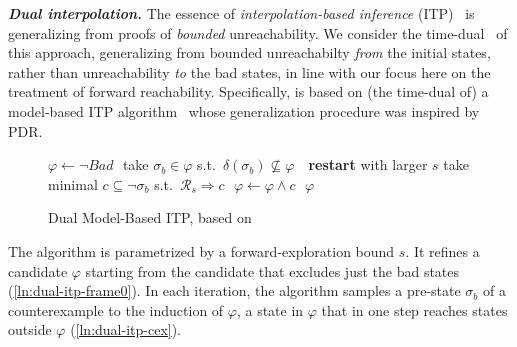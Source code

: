 \documentclass[acmsmall,screen]{acmart}
\newcommand{\para}[1]{\vspace{2pt}\noindent\textbf{\textit{#1.}}}
\renewcommand{\implies}{\Longrightarrow}
\newcommand{\Init}{{\textit{Init}}}
\newcommand{\Bad}{\textit{Bad}}
\newcommand{\tr}{\delta}
\begin{document}
\para{Dual interpolation}
\label{sec:dual-itp-compare}
%
%
%
%
%
%
%
%
%
%
%
%
%
%
%
%
%
%
%
%
%
%
%
%
%
%
%
%
%
%
%
%
The essence of \emph{interpolation-based inference} (ITP)~\cite{DBLP:conf/cav/McMillan03} is generalizing from proofs of \emph{bounded} unreachability.
We consider the time-dual~\cite[e.g.][Appendix A]{DBLP:journals/pacmpl/FeldmanISS20} of this approach, generalizing from bounded unreachabilty \emph{from} the initial states, rather than unreachability \emph{to} the bad states,
%
in line with our focus here on the treatment of forward reachability.
Specifically,  is based on (the time-dual of) a model-based ITP algorithm~\cite{DBLP:conf/hvc/ChocklerIM12,DBLP:conf/lpar/BjornerGKL13} whose generalization procedure was inspired by PDR.
%

\iflong
%
\begin{wrapfigure}{r}{0.45\textwidth}
\vspace{-0.4cm}
\begin{minipage}{0.45\textwidth}
\begin{algorithm}[H]
\caption{Dual Model-Based ITP, based on~\cite{DBLP:conf/hvc/ChocklerIM12,DBLP:conf/lpar/BjornerGKL13}}
\label{alg:dual-itp-termmin}
\begin{algorithmic}[1]
\begin{footnotesize}
\Procedure{Dual-Model-Based-ITP}{$\Init$,$\tr$,$\Bad$,$s$}
	\State $\varphi \gets \neg \Bad$ $\label{ln:dual-itp-frame0}$
		\State take $\sigma_b \in \varphi$ s.t.\ $\tr(\sigma_b) \not\subseteq \varphi$ $\label{ln:dual-itp-cex}$
		 $\label{ln:dual-itp-restart}$
			\State \textbf{restart} with larger $s$
		\EndIf
		\State take minimal $c \subseteq \neg \sigma_b$ s.t.\ $\mathcal{R}_s \implies c$  $\label{ln:dual-itp-bmc}$
		\State $\varphi \gets \varphi \land c$ $\label{ln:dual-itp-learn}$
	\EndWhile
	\State \Return $\varphi$
\EndProcedure
\end{footnotesize}
\end{algorithmic}
\end{algorithm}
\end{minipage}
\vspace{-0.5cm}
\end{wrapfigure}%
The algorithm is parametrized by a forward-exploration bound $s$. It refines a candidate $\varphi$ starting from the candidate that excludes just the bad states (\cref{ln:dual-itp-frame0}).
In each iteration,
%
the algorithm samples a pre-state $\sigma_b$ of a counterexample to the induction of $\varphi$, a state in $\varphi$ that in one step reaches states outside $\varphi$ (\cref{ln:dual-itp-cex}).
\end{document}
